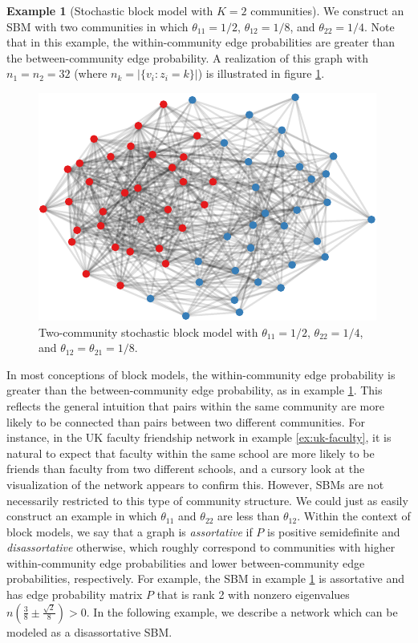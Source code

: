 \documentclass[
  11pt,
]{article}
\theoremstyle{definition}
\theoremstyle{definition}
\newtheorem{example}{Example}[section]
\theoremstyle{definition}
\theoremstyle{definition}
\theoremstyle{remark}
\begin{document}
\begin{example}[Stochastic block model with $K = 2$ communities]
\label{ex:assort-sbm}
We construct an SBM with two communities in which $\theta_{11} = 1/2$, $\theta_{12} = 1/8$, and $\theta_{22} = 1/4$. 
Note that in this example, the within-community edge probabilities are greater than the between-community edge probability. 
A realization of this graph with $n_1 = n_2 = 32$ (where $n_k = |\{v_i : z_i = k\}|$) is illustrated in figure \ref{fig:assort-sbm}.

\begin{figure}[H]

{\centering \includegraphics{draft_files/figure-latex/assort-sbm-1} 

}

\caption{Two-community stochastic block model with $\theta_{11}=1/2$, $\theta_{22}=1/4$, and $\theta_{12} = \theta_{21} = 1/8$.}\label{fig:assort-sbm}
\end{figure}
\end{example}

In most conceptions of block models, the within-community edge probability is greater than the between-community edge probability, as in example \ref{ex:assort-sbm}.
This reflects the general intuition that pairs within the same community are more likely to be connected than pairs between two different communities.
For instance, in the UK faculty friendship network in example \ref{ex:uk-faculty}, it is natural to expect that faculty within the same school are more likely to be friends than faculty from two different schools, and a cursory look at the visualization of the network appears to confirm this.
However, SBMs are not necessarily restricted to this type of community structure.
We could just as easily construct an example in which \(\theta_{11}\) and \(\theta_{22}\) are less than \(\theta_{12}\).
Within the context of block models, we say that a graph is \emph{assortative} if \(P\) is positive semidefinite and \emph{disassortative} otherwise, which roughly correspond to communities with higher within-community edge probabilities and lower between-community edge probabilities, respectively.
For example, the SBM in example \ref{ex:assort-sbm} is assortative and has edge probability matrix \(P\) that is rank 2 with nonzero eigenvalues \(n (\frac{3}{8} \pm \frac{\sqrt{2}}{8}) > 0\).
In the following example, we describe a network which can be modeled as a disassortative SBM.
\end{document}
